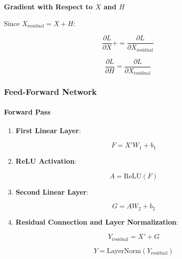 \documentclass{article}
\begin{document}
\textbf{Gradient with Respect to $X$ and $H$}

Since $X_{\text{residual}} = X + H$:

\begin{equation}
    \frac{\partial L}{\partial X} += \frac{\partial L}{\partial X_{\text{residual}}}
\end{equation}

\begin{equation}
    \frac{\partial L}{\partial H} = \frac{\partial L}{\partial X_{\text{residual}}}
\end{equation}

\subsubsection{Feed-Forward Network}

\paragraph{Forward Pass}

\begin{enumerate}
    \item \textbf{First Linear Layer}:

    \begin{equation}
        F = X' W_1 + b_1
    \end{equation}

    \item \textbf{ReLU Activation}:

    \begin{equation}
        A = \text{ReLU}(F)
    \end{equation}

    \item \textbf{Second Linear Layer}:

    \begin{equation}
        G = A W_2 + b_2
    \end{equation}

    \item \textbf{Residual Connection and Layer Normalization}:

    \begin{equation}
        Y_{\text{residual}} = X' + G
    \end{equation}

    \begin{equation}
        Y = \text{LayerNorm}(Y_{\text{residual}})
    \end{equation}
\end{enumerate}
\end{document}
